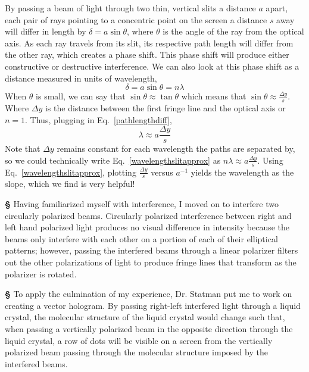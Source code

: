 \documentclass[12pt]{article}
\begin{document}
By passing a beam of light through two thin, vertical slits a distance $a$ apart, each pair of rays pointing to a concentric point on the screen a distance $s$ away will differ in length by $\delta=a\sin\theta$, where $\theta$ is the angle of the ray from the optical axis. As each ray travels from its slit, its respective path length will differ from the other ray, which creates a phase shift. This phase shift will produce either constructive or destructive interference. We can also look at this phase shift as a distance measured in units of wavelength,
\begin{equation}\label{pathlengthdiff}
\delta=a\sin\theta=n\lambda
\end{equation}
When $\theta$ is small, we can say that $\sin\theta\approx\tan\theta$ which means that $\sin\theta\approx\frac{\Delta{y}}{s}$. Where $\Delta{y}$ is the distance between the first fringe line and the optical axis or $n=1$. Thus, plugging in Eq.~\eqref{pathlengthdiff},
\begin{equation}\label{wavelengthslitapprox}
\lambda\approx{a}\frac{\Delta{y}}{s}
\end{equation}
Note that $\Delta{y}$ remains constant for each wavelength the paths are separated by, so we could technically write Eq.~\eqref{wavelengthslitapprox} as $n\lambda\approx{a}\frac{\Delta{y}}{s}$. Using Eq.~\eqref{wavelengthslitapprox}, plotting $\frac{\Delta{y}}{s}$ versus $a^{-1}$ yields the wavelength as the slope, which we find is very helpful!

\vspace{15px}
\noindent
\large{\textbf{\S}} Having familiarized myself with interference, I moved on to interfere two circularly polarized beams. Circularly polarized interference between right and left hand polarized light produces no visual difference in intensity because the beams only interfere with each other on a portion of each of their elliptical patterns; however, passing the interfered beams through a linear polarizer filters out the other polarizations of light to produce fringe lines that transform as the polarizer is rotated.

\vspace{15px}
\noindent
\large{\textbf{\S}} To apply the culmination of my experience, Dr. Statman put me to work on creating a vector hologram. By passing right-left interfered light through a liquid crystal, the molecular structure of the liquid crystal would change such that, when passing a vertically polarized beam in the opposite direction through the liquid crystal, a row of dots will be visible on a screen from the vertically polarized beam passing through the molecular structure imposed by the interfered beams.
\end{document}
